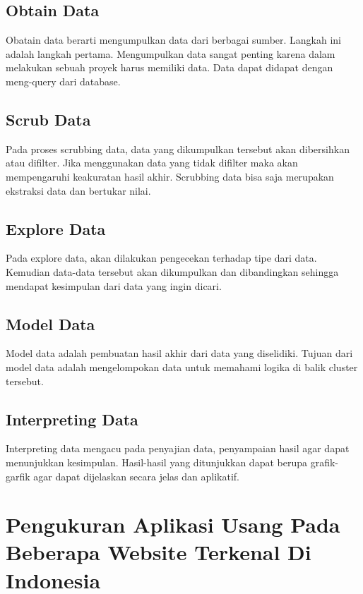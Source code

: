 \subsection{Obtain Data}
Obatain data berarti mengumpulkan data dari berbagai sumber. Langkah ini adalah langkah pertama. Mengumpulkan data sangat penting karena dalam melakukan sebuah proyek harus memiliki data. Data dapat didapat dengan meng-query dari database.

\subsection{Scrub Data}
Pada proses scrubbing data, data yang dikumpulkan tersebut akan dibersihkan atau difilter. Jika menggunakan data yang tidak difilter maka akan mempengaruhi keakuratan hasil akhir. Scrubbing data bisa saja merupakan ekstraksi data dan bertukar nilai.

\subsection{Explore Data}
Pada explore data, akan dilakukan pengecekan terhadap tipe dari data. Kemudian data-data tersebut akan dikumpulkan dan dibandingkan sehingga mendapat kesimpulan dari data yang ingin dicari. 

\subsection{Model Data}
Model data adalah pembuatan hasil akhir dari data yang diselidiki. Tujuan dari model data adalah mengelompokan data untuk memahami logika di balik cluster tersebut. 

\subsection{Interpreting Data}
Interpreting data mengacu pada penyajian data, penyampaian hasil agar dapat menunjukkan kesimpulan. Hasil-hasil yang ditunjukkan dapat berupa grafik-garfik agar dapat dijelaskan secara jelas dan aplikatif.




\section{Pengukuran Aplikasi Usang Pada Beberapa Website Terkenal Di Indonesia\cite{pascal}}
